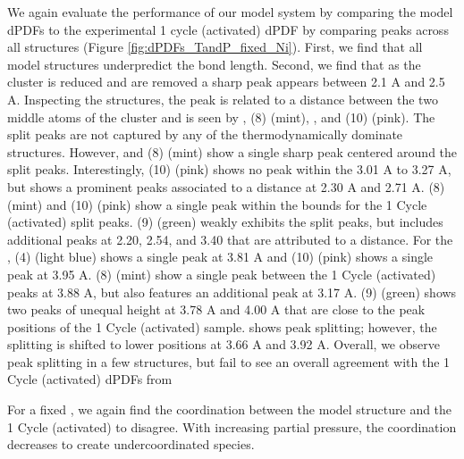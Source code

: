 \documentclass[journal=jctcce,manuscript=article]{achemso}
\begin{document}
We again evaluate the performance of our model system by comparing the model dPDFs to the experimental 1 cycle (activated) dPDF by comparing peaks across all structures (Figure \ref{fig:dPDFs_TandP_fixed_Ni}). First, we find that all model structures underpredict the  bond length. Second, we find that as the cluster is reduced and  are removed a sharp peak appears between 2.1 A and 2.5 A. Inspecting the structures, the peak is related to a  distance between the two middle atoms of the cluster and is seen by , (8)  (mint), , and (10)  (pink). The split  peaks are not captured by any of the thermodynamically dominate structures. However,  and (8)  (mint) show a single sharp peak centered around the split  peaks. Interestingly, (10)  (pink) shows no peak within the 3.01 A to 3.27 A, but shows a prominent peaks associated to a  distance at 2.30 A and 2.71 A. (8)  (mint) and (10)  (pink) show a single peak within the bounds for the 1 Cycle (activated)  split peaks. (9)   (green) weakly exhibits the split  peaks, but includes additional peaks at 2.20, 2.54, and 3.40 that are attributed to a  distance. For the , (4)  (light blue) shows a single peak at 3.81 A and (10)  (pink) shows a single peak at 3.95 A. (8)  (mint) show a single peak between the 1 Cycle (activated) peaks at 3.88 A, but also features an additional  peak at 3.17 A. (9)   (green) shows two peaks of unequal height at 3.78 A and 4.00 A that are close to the peak positions of the 1 Cycle (activated) sample.  shows  peak splitting; however, the splitting is shifted to lower positions at 3.66 A and 3.92 A. Overall, we observe peak splitting in a few structures, but fail to see an overall agreement with the 1 Cycle (activated) dPDFs from \citeauthor{PlateroPrats2017} 

For a fixed , we again find the coordination between the model structure and the 1 Cycle (activated) to disagree. With increasing  partial pressure, the  coordination decreases to create undercoordinated  species.
\end{document}
